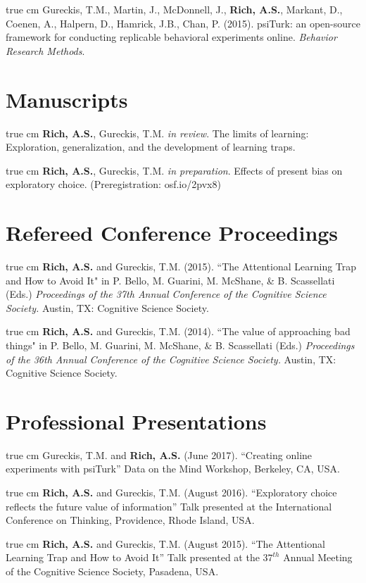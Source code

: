 \documentclass[12pt]{my_cv}
\def\ind{\hangindent=1 true cm\hangafter=1 \noindent}
\begin{document}
\ind Gureckis, T.M., Martin, J., McDonnell, J., \textbf{Rich, A.S.}, Markant,
D., Coenen, A., Halpern, D., Hamrick, J.B., Chan, P. (2015). psiTurk: an
open-source framework for conducting replicable behavioral experiments online.
\emph{Behavior Research Methods}.

\section{Manuscripts}

\ind \textbf{Rich, A.S.}, Gureckis, T.M. \emph{in review}. The limits of learning:
Exploration, generalization, and the development of learning traps.

\ind \textbf{Rich, A.S.}, Gureckis, T.M. \emph{in preparation}. Effects of
present bias on exploratory choice. (Preregistration: osf.io/2pvx8)

\section{Refereed Conference Proceedings}

\ind \textbf{Rich, A.S.} and Gureckis, T.M. (2015). ``The Attentional Learning Trap and How to Avoid It" in P. Bello, M. Guarini, M. McShane, \& B. Scassellati (Eds.) \emph{Proceedings of the 37th Annual Conference of the Cognitive Science Society.} Austin, TX: Cognitive Science Society.	

\ind \textbf{Rich, A.S.} and Gureckis, T.M. (2014). ``The value of approaching bad things" in P. Bello, M. Guarini, M. McShane, \& B. Scassellati (Eds.) \emph{Proceedings of the 36th Annual Conference of the Cognitive Science Society.} Austin, TX: Cognitive Science Society.	

\section{Professional Presentations}

\ind Gureckis, T.M. and \textbf{Rich, A.S.} (June 2017). ``Creating online
experiments with psiTurk'' Data on the Mind Workshop, Berkeley, CA, USA.

\ind \textbf{Rich, A.S.} and Gureckis, T.M. (August 2016). ``Exploratory choice
reflects the future value of information'' Talk presented at the International
Conference on Thinking, Providence, Rhode Island, USA.

\ind \textbf{Rich, A.S.} and Gureckis, T.M. (August 2015). ``The Attentional
Learning Trap and How to Avoid It'' Talk presented at the $37^{th}$ Annual Meeting of the
Cognitive Science Society, Pasadena, USA.
\end{document}
